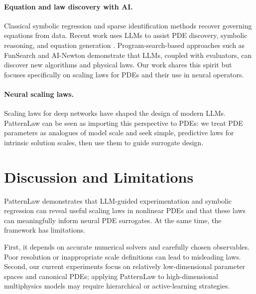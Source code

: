 \documentclass{article}
\theoremstyle{plain}
\theoremstyle{definition}
\theoremstyle{remark}
\begin{document}
\paragraph{Equation and law discovery with AI.}
Classical symbolic regression and sparse identification methods \citep{Rudy2017PDEDiscovery} recover governing equations from data. Recent work uses LLMs to assist PDE discovery, symbolic reasoning, and equation generation \citep{Du2024LLMEquationDiscovery,Luo2025LLMPDEDiscovery,Ivanchik2025LLMDream,Bhatnagar2025SymbolicPDELLM}. Program-search-based approaches such as FunSearch \citep{RomeraParedes2024FunSearch} and AI-Newton \citep{Fang2025AINewton} demonstrate that LLMs, coupled with evaluators, can discover new algorithms and physical laws. Our work shares this spirit but focuses specifically on scaling laws for PDEs and their use in neural operators.

\paragraph{Neural scaling laws.}
Scaling laws for deep networks \citep{Kaplan2020ScalingLaws,Hoffmann2022Chinchilla,Bahri2024ExplainingScaling,Sengupta2025ScalingSurvey} have shaped the design of modern LLMs. PatternLaw can be seen as importing this perspective to PDEs: we treat PDE parameters as analogues of model scale and seek simple, predictive laws for intrinsic solution scales, then use them to guide surrogate design.

\section{Discussion and Limitations}

PatternLaw demonstrates that LLM-guided experimentation and symbolic regression can reveal useful scaling laws in nonlinear PDEs and that these laws can meaningfully inform neural PDE surrogates. At the same time, the framework has limitations.

First, it depends on accurate numerical solvers and carefully chosen observables. Poor resolution or inappropriate scale definitions can lead to misleading laws. Second, our current experiments focus on relatively low-dimensional parameter spaces and canonical PDEs; applying PatternLaw to high-dimensional multiphysics models may require hierarchical or active-learning strategies.
\end{document}
